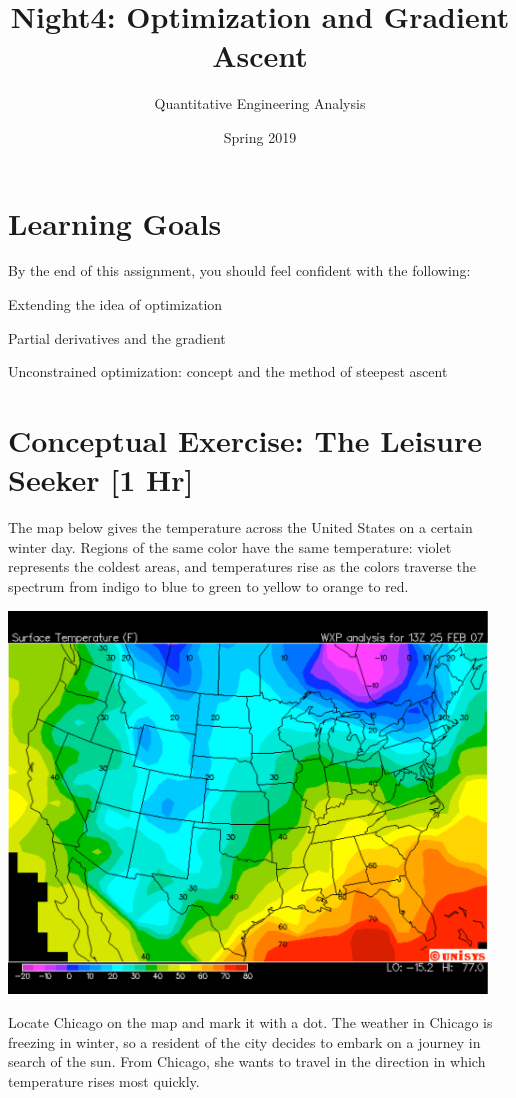 \documentclass[M3_Night4_Solutions]{subfiles}
\title{Night4: Optimization and Gradient Ascent}
\author{Quantitative Engineering Analysis}
\date{Spring 2019}
\begin{document}
\maketitle
\thispagestyle{firstpage}

\section{Learning Goals}
By the end of this assignment, you should feel confident with the following:
\bi
\item Extending the idea of optimization
\item Partial derivatives and the gradient
\item Unconstrained optimization: concept and the method of steepest ascent
\ei

\section{Conceptual Exercise: The Leisure Seeker [1 Hr]}

The map below gives the temperature across the United States on a certain winter day.  
Regions of the same color have the same temperature: violet 
represents the coldest areas, and temperatures rise as the colors traverse the 
spectrum from indigo to blue to green to yellow to orange to red.
\begin{center}

\includegraphics[width=5in]{figs/WeatherMap.pdf} 
\end{center}

Locate Chicago on the map and mark it with a dot.  The weather in Chicago is 
freezing in winter, so a resident of the city decides to embark on a journey in 
search of the sun.  From Chicago,  she wants to travel in the direction in which 
temperature rises most quickly.  
\end{document}
